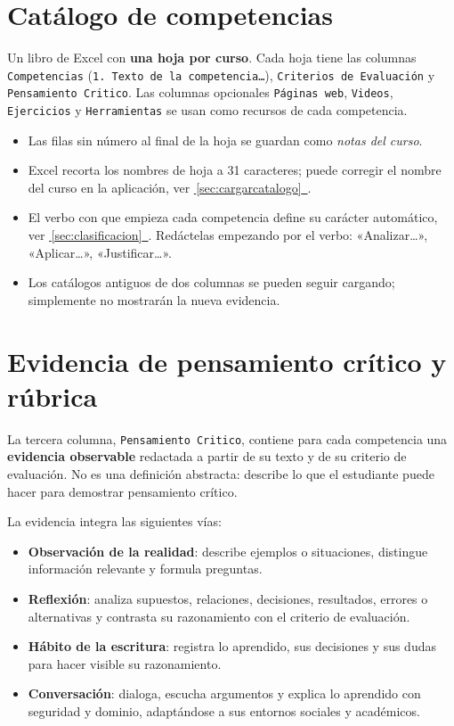 \documentclass[11pt,letterpaper,oneside]{report}
\newcommand{\ver}[1]{\hyperref[#1]{\faArrowCircleRight\,\ref*{#1}~\nameref*{#1}}}
\newcommand{\col}[1]{\texttt{\small #1}}
\begin{document}
\section{Catálogo de competencias}\label{sec:catalogo}
Un libro de Excel con \textbf{una hoja por curso}. Cada hoja tiene las columnas \col{Competencias} (\texttt{1. Texto de la competencia…}), \col{Criterios de Evaluación} y \col{Pensamiento Critico}. Las columnas opcionales \col{Páginas web}, \col{Videos}, \col{Ejercicios} y \col{Herramientas} se usan como recursos de cada competencia.
\begin{itemize}
  \item Las filas sin número al final de la hoja se guardan como \emph{notas del curso}.
  \item Excel recorta los nombres de hoja a 31 caracteres; puede corregir el nombre del curso en la aplicación, ver \ver{sec:cargarcatalogo}.
  \item El verbo con que empieza cada competencia define su carácter automático, ver \ver{sec:clasificacion}. Redáctelas empezando por el verbo: «Analizar…», «Aplicar…», «Justificar…».
  \item Los catálogos antiguos de dos columnas se pueden seguir cargando; simplemente no mostrarán la nueva evidencia.
\end{itemize}

\section{Evidencia de pensamiento crítico y rúbrica}\label{sec:evidenciapc}
La tercera columna, \col{Pensamiento Critico}, contiene para cada competencia una \textbf{evidencia observable} redactada a partir de su texto y de su criterio de evaluación. No es una definición abstracta: describe lo que el estudiante puede hacer para demostrar pensamiento crítico.

La evidencia integra las siguientes vías:
\begin{itemize}
  \item \textbf{Observación de la realidad}: describe ejemplos o situaciones, distingue información relevante y formula preguntas.
  \item \textbf{Reflexión}: analiza supuestos, relaciones, decisiones, resultados, errores o alternativas y contrasta su razonamiento con el criterio de evaluación.
  \item \textbf{Hábito de la escritura}: registra lo aprendido, sus decisiones y sus dudas para hacer visible su razonamiento.
  \item \textbf{Conversación}: dialoga, escucha argumentos y explica lo aprendido con seguridad y dominio, adaptándose a sus entornos sociales y académicos.
\end{itemize}
\end{document}
